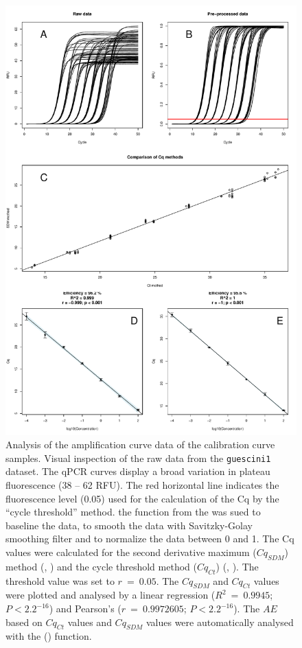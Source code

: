 \begin{figure}[htbp]
  \centering
  \includegraphics[clip=true, width=14cm]{figures/dilution_Cq.pdf}
  \caption{Analysis of the amplification curve data of the calibration curve 
samples.  Visual inspection of the raw data from the 
\texttt{guescini1} dataset. The qPCR curves display a broad variation in plateau 
fluorescence (38 -- 62 RFU). The red horizontal line indicates the fluorescence 
level (0.05) used for the calculation of the Cq by the ``cycle threshold'' 
method.  the  function from the  was sued 
to baseline the data, to smooth the data with Savitzky-Golay smoothing filter 
and to normalize the data between 0 and 1.  The Cq values were 
calculated for the second derivative maximum ($Cq_{SDM}$) method (, 
) and the cycle threshold method ($Cq_{Ct}$) (, 
). The threshold value was set to $r~=~0.05$. The $Cq_{SDM}$ 
and $Cq_{Ct}$ values were plotted and analysed by a linear regression 
($R^{2}~=~0.9945$; $P < 2.2^{-16}$) and Pearson's ($r~=~0.9972605$; $P < 
2.2^{-16}$). The $AE$ based on  $Cq_{Ct}$ values and  
$Cq_{SDM}$ values were automatically analysed with the  
() function.}
  \label{figure:dilution_Cq}
\end{figure}

